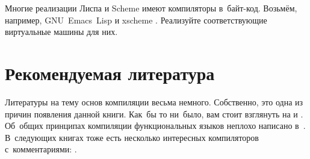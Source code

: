 \begin{project}
Многие реализации Лиспа и Scheme имеют компиляторы в~байт-код. Возьмём,
например, GNU~Emacs~Lisp \cite{llst93} и xscheme \cite{bet91}. Реализуйте
соответствующие виртуальные машины для них.
\end{project}


\section*{Рекомендуемая литература}\label{compilation/sect:recommended-reading}

Литературы на тему основ компиляции весьма немного. Собственно, это одна из
причин появления данной книги. Как~бы то ни~было, вам стоит взглянуть на
\cite{all78} и \cite{hen80}. Об~общих принципах компиляции функциональных языков
неплохо написано в~\cite{dil88}. В~следующих книгах тоже есть несколько
интересных компиляторов с~комментариями: \cite{ste78,as85,fwh92}.

